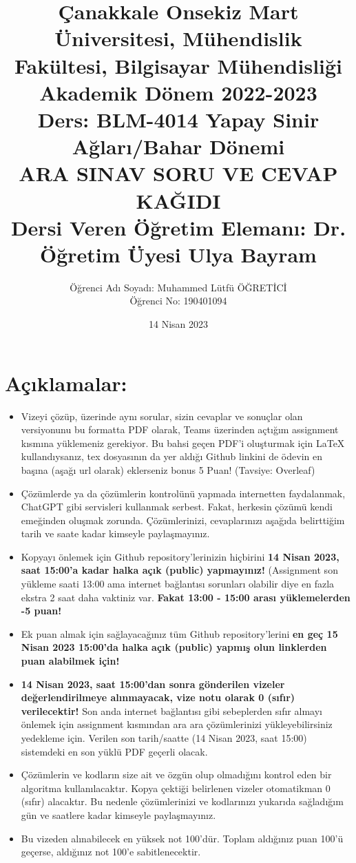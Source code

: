 \documentclass[11pt]{article}
\title{Çanakkale Onsekiz Mart Üniversitesi, Mühendislik Fakültesi, Bilgisayar Mühendisliği Akademik Dönem 2022-2023\\
Ders: BLM-4014 Yapay Sinir Ağları/Bahar Dönemi\\ 
ARA SINAV SORU VE CEVAP KAĞIDI\\
Dersi Veren Öğretim Elemanı: Dr. Öğretim Üyesi Ulya Bayram}
\author{%
\begin{minipage}{\textwidth}
\raggedright
Öğrenci Adı Soyadı: Muhammed Lütfü ÖĞRETİCİ\\ %
Öğrenci No: 190401094
\end{minipage}%
}
\date{14 Nisan 2023}
\begin{document}
\maketitle

\vspace{-.5in}
\section*{Açıklamalar:}
\begin{itemize}
    \item Vizeyi çözüp, üzerinde aynı sorular, sizin cevaplar ve sonuçlar olan versiyonunu bu formatta PDF olarak, Teams üzerinden açtığım assignment kısmına yüklemeniz gerekiyor. Bu bahsi geçen PDF'i oluşturmak için LaTeX kullandıysanız, tex dosyasının da yer aldığı Github linkini de ödevin en başına (aşağı url olarak) eklerseniz bonus 5 Puan! (Tavsiye: Overleaf)
    \item Çözümlerde ya da çözümlerin kontrolünü yapmada internetten faydalanmak, ChatGPT gibi servisleri kullanmak serbest. Fakat, herkesin çözümü kendi emeğinden oluşmak zorunda. Çözümlerinizi, cevaplarınızı aşağıda belirttiğim tarih ve saate kadar kimseyle paylaşmayınız. 
    \item Kopyayı önlemek için Github repository'lerinizin hiçbirini \textbf{14 Nisan 2023, saat 15:00'a kadar halka açık (public) yapmayınız!} (Assignment son yükleme saati 13:00 ama internet bağlantısı sorunları olabilir diye en fazla ekstra 2 saat daha vaktiniz var. \textbf{Fakat 13:00 - 15:00 arası yüklemelerden -5 puan!}
    \item Ek puan almak için sağlayacağınız tüm Github repository'lerini \textbf{en geç 15 Nisan 2023 15:00'da halka açık (public) yapmış olun linklerden puan alabilmek için!}
    \item \textbf{14 Nisan 2023, saat 15:00'dan sonra gönderilen vizeler değerlendirilmeye alınmayacak, vize notu olarak 0 (sıfır) verilecektir!} Son anda internet bağlantısı gibi sebeplerden sıfır almayı önlemek için assignment kısmından ara ara çözümlerinizi yükleyebilirsiniz yedekleme için. Verilen son tarih/saatte (14 Nisan 2023, saat 15:00) sistemdeki en son yüklü PDF geçerli olacak.
    \item Çözümlerin ve kodların size ait ve özgün olup olmadığını kontrol eden bir algoritma kullanılacaktır. Kopya çektiği belirlenen vizeler otomatikman 0 (sıfır) alacaktır. Bu nedenle çözümlerinizi ve kodlarınızı yukarıda sağladığım gün ve saatlere kadar kimseyle paylaşmayınız.
    \item Bu vizeden alınabilecek en yüksek not 100'dür. Toplam aldığınız puan 100'ü geçerse, aldığınız not 100'e sabitlenecektir.

\end{itemize}
\end{document}
